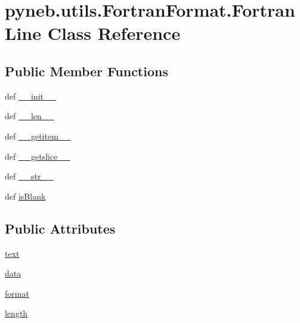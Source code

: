\hypertarget{classpyneb_1_1utils_1_1_fortran_format_1_1_fortran_line}{\section{pyneb.\-utils.\-Fortran\-Format.\-Fortran\-Line Class Reference}
\label{classpyneb_1_1utils_1_1_fortran_format_1_1_fortran_line}
}
\subsection*{Public Member Functions}
\begin{DoxyCompactItemize}
\item 
def \hyperlink{classpyneb_1_1utils_1_1_fortran_format_1_1_fortran_line_a292ba8e3d93bd751d6d13fdc1671ccb2}{\-\_\-\-\_\-init\-\_\-\-\_\-}
\item 
def \hyperlink{classpyneb_1_1utils_1_1_fortran_format_1_1_fortran_line_a7d96f9559e2ab1cb3063c39ae4ffb705}{\-\_\-\-\_\-len\-\_\-\-\_\-}
\item 
def \hyperlink{classpyneb_1_1utils_1_1_fortran_format_1_1_fortran_line_af8518fcb682e3b3dacd0f6d6a5426a6f}{\-\_\-\-\_\-getitem\-\_\-\-\_\-}
\item 
def \hyperlink{classpyneb_1_1utils_1_1_fortran_format_1_1_fortran_line_a254e9ffe16d03e83e4bf528391ca1159}{\-\_\-\-\_\-getslice\-\_\-\-\_\-}
\item 
def \hyperlink{classpyneb_1_1utils_1_1_fortran_format_1_1_fortran_line_a0c30b0c95b3635dc340af06643837a25}{\-\_\-\-\_\-str\-\_\-\-\_\-}
\item 
def \hyperlink{classpyneb_1_1utils_1_1_fortran_format_1_1_fortran_line_a4c16537dbbd761cae9dc3f01e2ae80f6}{is\-Blank}
\end{DoxyCompactItemize}
\subsection*{Public Attributes}
\begin{DoxyCompactItemize}
\item 
\hyperlink{classpyneb_1_1utils_1_1_fortran_format_1_1_fortran_line_a70d4893b8dd8ae61297b1d3e4b8bc612}{text}
\item 
\hyperlink{classpyneb_1_1utils_1_1_fortran_format_1_1_fortran_line_a5976b8e1d4375a2ea62b9359bcf84697}{data}
\item 
\hyperlink{classpyneb_1_1utils_1_1_fortran_format_1_1_fortran_line_ae97c8744bdb9817ec8a9c58b7a6bfe20}{format}
\item 
\hyperlink{classpyneb_1_1utils_1_1_fortran_format_1_1_fortran_line_a4cd0f5ee28f8250f2c6fbbb9ff890e0a}{length}
\end{DoxyCompactItemize}
